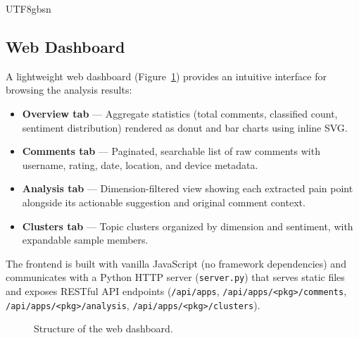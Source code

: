 \documentclass[11pt,a4paper]{article}
\begin{document}
\begin{CJK*}{UTF8}{gbsn}
\subsection{Web Dashboard}

A lightweight web dashboard (Figure~\ref{fig:dashboard}) provides an intuitive interface for browsing the analysis results:

\begin{itemize}[nosep]
  \item \textbf{Overview tab} --- Aggregate statistics (total comments, classified count, sentiment distribution) rendered as donut and bar charts using inline SVG.
  \item \textbf{Comments tab} --- Paginated, searchable list of raw comments with username, rating, date, location, and device metadata.
  \item \textbf{Analysis tab} --- Dimension-filtered view showing each extracted pain point alongside its actionable suggestion and original comment context.
  \item \textbf{Clusters tab} --- Topic clusters organized by dimension and sentiment, with expandable sample members.
\end{itemize}

The frontend is built with vanilla JavaScript (no framework dependencies) and communicates with a Python HTTP server (\texttt{server.py}) that serves static files and exposes RESTful API endpoints (\texttt{/api/apps}, \texttt{/api/apps/<pkg>/comments}, \texttt{/api/apps/<pkg>/analysis}, \texttt{/api/apps/<pkg>/clusters}).

\begin{figure}[H]
\centering
{}
\caption{Structure of the web dashboard.}
\label{fig:dashboard}
\end{figure}



\end{CJK*}
\end{document}
